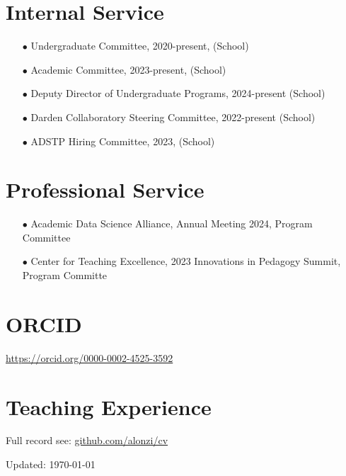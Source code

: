 \documentclass{article}[10pt]
\begin{document}
\section*{Internal Service}

\begin{itemize}
\item [$\bullet$] Undergraduate Committee, 2020-present, (School)
\item [$\bullet$] Academic Committee, 2023-present, (School)
\item [$\bullet$] Deputy Director of Undergraduate Programs, 2024-present (School)
\item [$\bullet$] Darden Collaboratory Steering Committee, 2022-present (School)
\item [$\bullet$] ADSTP Hiring Committee, 2023, (School)
\end{itemize}


\section*{Professional Service}
\begin{itemize}
\item [$\bullet$] Academic Data Science Alliance, Annual Meeting 2024, Program Committee
\item [$\bullet$] Center for Teaching Excellence, 2023 Innovations in Pedagogy Summit, Program Committe
\end{itemize}


\section*{ORCID}
\href{https://orcid.org/0000-0002-4525-3592}{https://orcid.org/0000-0002-4525-3592}




\section*{Teaching Experience}

Full record see: \href{https://github.com/alonzi/cv/blob/master/teaching-record.md}{github.com/alonzi/cv}







\begin{center} Updated: \today \end{center}
\end{document}
